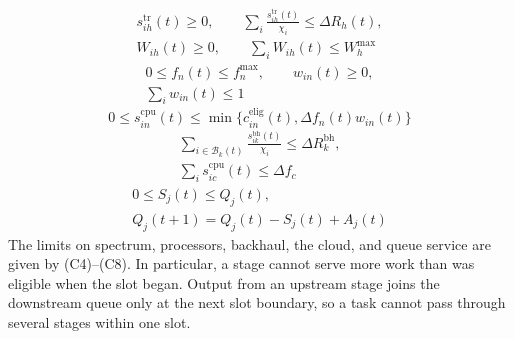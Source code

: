 \begin{equation}
\begin{gathered}
s_{ih}^{\mathrm{tr}}(t)\ge0,\qquad
\sum_i\frac{s_{ih}^{\mathrm{tr}}(t)}{\chi_i}\le\Delta R_h(t),\\
W_{ih}(t)\ge0,\qquad \sum_iW_{ih}(t)\le W_h^{\max}
\end{gathered}
\tag{C4}\label{con:radio}
\end{equation}
\begin{equation}
\begin{gathered}
0\le f_n(t)\le f_n^{\max},\qquad w_{in}(t)\ge0,\\
\sum_iw_{in}(t)\le1
\end{gathered}
\tag{C5}\label{con:processor}
\end{equation}
\begin{equation}
0\le s_{in}^{\mathrm{cpu}}(t)\le
\min\{c_{in}^{\mathrm{elig}}(t),\Delta f_n(t)w_{in}(t)\}
\tag{C6}\label{con:cpu-service}
\end{equation}
\begin{equation}
\begin{gathered}
\sum_{i\in\mathcal B_k(t)}\frac{s_{ik}^{\mathrm{bh}}(t)}{\chi_i}
\le\Delta R_k^{\mathrm{bh}},\\
\sum_i s_{ic}^{\mathrm{cpu}}(t)\le\Delta f_c
\end{gathered}
\tag{C7}\label{con:backhaul-cloud}
\end{equation}
\begin{equation}
\begin{gathered}
0\le S_j(t)\le Q_j(t),\\
Q_j(t+1)=Q_j(t)-S_j(t)+A_j(t)
\end{gathered}
\tag{C8}\label{con:queue-causality}
\end{equation}
The limits on spectrum, processors, backhaul, the cloud, and queue service
are given by (C4)--(C8). In particular, a stage cannot serve more work than was
eligible when the slot began. Output from an upstream stage joins the
downstream queue only at the next slot boundary, so a task cannot pass
through several stages within one slot.

